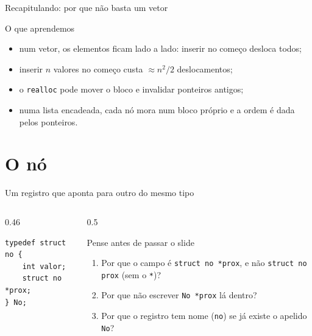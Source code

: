 \documentclass[aspectratio=169]{beamer}
\begin{document}
\begin{frame}{Recapitulando: por que não basta um vetor}
  \begin{block}{O que aprendemos}
    \begin{itemize}
      \item num vetor, os elementos ficam lado a lado: inserir no começo
        desloca todos;
      \item inserir $n$ valores no começo custa $\approx n^2/2$
        deslocamentos;
      \item o \texttt{realloc} pode mover o bloco e invalidar ponteiros
        antigos;
      \item numa lista encadeada, cada nó mora num bloco próprio e a ordem
        é dada pelos ponteiros.
    \end{itemize}
  \end{block}
\end{frame}

\section{O nó}

\begin{frame}[fragile]{Um registro que aponta para outro do mesmo tipo}
  \begin{columns}[c]
    \begin{column}{0.46\textwidth}
\begin{lstlisting}[style=tinyC]
typedef struct no {
    int valor;
    struct no *prox;
} No;
\end{lstlisting}
    \end{column}
    \begin{column}{0.5\textwidth}
      \begin{block}{Pense antes de passar o slide}
        \small
        \begin{enumerate}
          \item Por que o campo é \texttt{struct no *prox}, e não
            \texttt{struct no prox} (sem o \texttt{*})?
          \item Por que não escrever \texttt{No *prox} lá dentro?
          \item Por que o registro tem nome (\texttt{no}) se já existe o
            apelido \texttt{No}?
        \end{enumerate}
      \end{block}
    \end{column}
  \end{columns}
\end{frame}
\end{document}
